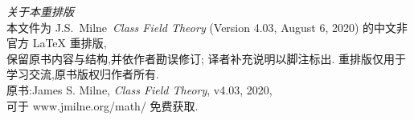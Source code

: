 \thispagestyle{empty}
\begin{center}
    \small
    \noindent\emph{关于本重排版}\\[0.5em]
    本文件为 J.S.\ Milne\ \emph{Class Field Theory} (Version 4.03, August 6, 2020)
    的中文非官方 \LaTeX{} 重排版,\\
    保留原书内容与结构,并依作者勘误修订; 译者补充说明以脚注标出.
    重排版仅用于学习交流,原书版权归作者所有.\\
    \vspace{0.5cm}
    原书:James S. Milne, \textit{Class Field Theory}, v4.03, 2020,\\
    可于 www.jmilne.org/math/ 免费获取.
\end{center}
\cleardoublepage

